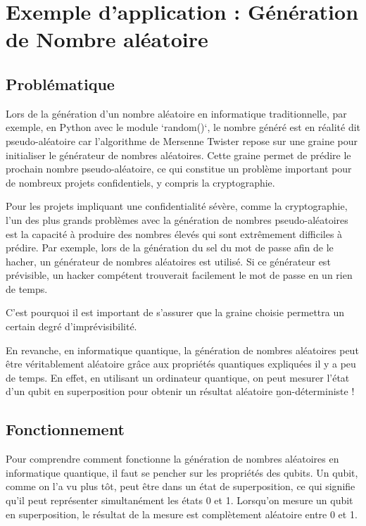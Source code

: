 \documentclass{article}
\begin{document}
\break\section{Exemple d'application : Génération de Nombre aléatoire}
\subsection{Problématique}

Lors de la génération d'un nombre aléatoire en informatique traditionnelle, par exemple, en Python avec le module `random()`, le nombre généré est en réalité dit pseudo-aléatoire car l'algorithme de Mersenne Twister repose sur une graine pour initialiser le générateur de nombres aléatoires. Cette graine permet de prédire le prochain nombre pseudo-aléatoire, ce qui constitue un problème important pour de nombreux projets confidentiels, y compris la cryptographie.

Pour les projets impliquant une confidentialité sévère, comme la cryptographie, l'un des plus grands problèmes avec la génération de nombres pseudo-aléatoires est la capacité à produire des nombres élevés qui sont extrêmement difficiles à prédire. Par exemple, lors de la génération du sel du mot de passe afin de le hacher, un générateur de nombres aléatoires est utilisé. Si ce générateur est prévisible, un hacker compétent trouverait facilement le mot de passe en un rien de temps.

C'est pourquoi il est important de s'assurer que la graine choisie permettra un certain degré d'imprévisibilité.

En revanche, en informatique quantique, 
la génération de nombres aléatoires peut être véritablement aléatoire grâce aux propriétés 
quantiques expliquées il y a peu de temps. En effet, en utilisant un ordinateur 
quantique, on peut mesurer l'état d'un qubit en superposition pour obtenir un résultat aléatoire \b{non-déterministe} !

\subsection{Fonctionnement}

Pour comprendre comment fonctionne la génération de nombres aléatoires en informatique quantique, il faut se pencher sur les propriétés des qubits. Un qubit, comme on l'a vu plus tôt, peut être dans un état de superposition, ce qui signifie qu'il peut représenter simultanément les états 0 et 1. Lorsqu'on mesure un qubit en superposition, le résultat de la mesure est complètement aléatoire entre 0 et 1.
\end{document}
